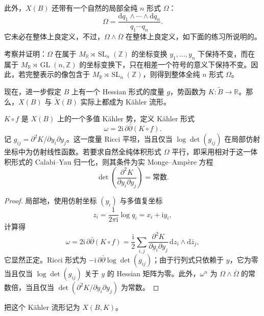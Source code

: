 此外，$X(B)$ 还带有一个自然的局部全纯 $n$ 形式 $\Omega$：
\[
\Omega=\frac{\mathrm dq_1\wedge\cdots\wedge\mathrm dq_n}{q_1\cdots q_n}.
\]
它未必在整体上良定义，不过，$\Omega\wedge\overline\Omega$ 在整体上良定义，如下面的练习所说明的。

\begin{exercise}\label{exer:6.13}
考察并证明：$\Omega$ 在属于 $M_{\mathbb R}\rtimes\operatorname{SL}_n(\mathbb Z)$ 的坐标变换 $y_1,\ldots,y_n$ 下保持不变，而在属于 $M_{\mathbb R}\rtimes\operatorname{GL}(n,\mathbb Z)$ 的坐标变换下，只在相差一个符号的意义下保持不变。因此，若完整表示的像包含于 $M_{\mathbb R}\rtimes\operatorname{SL}_n(\mathbb Z)$，则得到整体全纯 $n$ 形式 $\Omega$。
\end{exercise}

现在，进一步假定 $B$ 上有一个 Hessian 形式的度量 $g$，势函数为 $K\colon\widetilde B\to\mathbb R$。那么，$X(B)$ 与 $\check X(B)$ 实际上都成为 Kähler 流形。

\begin{proposition}\label{prop:6.14}
$K\circ f$ 是 $X(B)$ 上的一个多值 Kähler 势，定义 Kähler 形式
\[
\omega=2\mathrm i\,\partial\bar\partial(K\circ f).
\]
记 $g_{ij}=\partial^2K/\partial y_i\partial y_j$。这一度量 Ricci 平坦，当且仅当 $\log\det(g_{ij})$ 在局部仿射坐标中为仿射线性函数。若要求自然全纯体积形式 $\Omega$ 平行，即采用相对于这一体积形式的 Calabi--Yau 归一化，则其条件为实 Monge--Ampère 方程
\[
\det\!\left(\frac{\partial^2K}{\partial y_i\partial y_j}\right)=\text{常数}.
\]
\end{proposition}
\begin{proof}
局部地，使用仿射坐标 $(y_i)$ 与多值复坐标
\[
z_i=\frac{1}{2\pi\mathrm i}\log q_i=x_i+\mathrm i y_i,
\]
计算得
\[
\omega=2\mathrm i\,\partial\bar\partial(K\circ f)
=\frac{\mathrm i}{2}\sum_{i,j}
\frac{\partial^2K}{\partial y_i\partial y_j}\,
\mathrm dz_i\wedge\mathrm d\bar z_j,
\]
它显然正定。Ricci 形式为 $-\mathrm i\,\partial\bar\partial\log\det(g_{ij})$；由于行列式只依赖于 $y$，它为零当且仅当 $\log\det(g_{ij})$ 关于 $y$ 的 Hessian 矩阵为零。此外，$\omega^n$ 为 $\Omega\wedge\overline\Omega$ 的常数倍，当且仅当 $\det(\partial^2K/\partial y_i\partial y_j)$ 为常数。
\end{proof}

把这个 Kähler 流形记为 $X(B,K)$。

